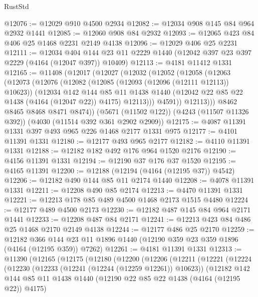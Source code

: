 \begin{lexlean}{RustStd}
\begin{coremodule}
@12076 := @12029 @910 @4500 @2934
@12082 := @12034 @908 @145 @84 @964 @2932 @1441
@12085 := @12060 @908 @84 @2932
@12093 := @12065 @423 @84 @406 @25 @1468 @2231 @2149 @4138
@12096 := @12029 @406 @25 @2231
@12111 := @12034
    @404
    @144
    @23
    @11
    @2229
    @1440
    (@12042 @397 @23 @397 @2229 (@4164 (@12047 @397)) @10409)
@12113 := @4181 @11412 @1331
@12165 := @11408
    (@12017
      (@12027
        (@12032
          (@12052
            (@12058
              (@12063
                (@12073
                  (@12076
                    (@12082
                      (@12085 (@12093 (@12096 (@12111 @12113)) @10623))
                      (@12034
                        @142
                        @144
                        @85
                        @11
                        @1438
                        @1440
                        (@12042 @22 @85 @22 @1438 (@4164 (@12047 @22)) @4175)
                        @12113)))
                  @4591))
              @12113)))
        @8462
        @8465
        @8468
        @8471
        @8474))
    (@5671 (@11502 @122))
    (@4243 (@11507 @11326 @392))
    (@4030 (@11514 @392 @361 @2902 @2909))
@12175 := @4087 @11391 @1331 @397 @493 @965 @226 @1468 @2177 @1331 @975
@12177 := @4101 @11391 @1331
@12180 := @12177 @493 @965 @2177
@12182 := @4110 @11391 @1331
@12188 := @12182 @182 @492 @176 @964 @1520 @2176
@12190 := @4156 @11391 @1331
@12194 := @12190 @37 @176 @37 @1520
@12195 := @4165 @11391
@12200 := @12188 (@12194 (@4164 (@12195 @37)) @4542)
@12206 := @12182 @490 @144 @85 @11 @2174 @1440
@12208 := @4078 @11391 @1331
@12211 := @12208 @490 @85 @2174
@12213 := @4470 @11391 @1331
@12221 := @12213 @178 @85 @489 @4500 @1468 @2173 @1515 @4480
@12224 := @12177 @489 @4500 @2173
@12230 := @12182 @487 @145 @84 @964 @2171 @1441
@12233 := @12208 @487 @84 @2171
@12241 := @12213 @423 @84 @486 @25 @1468 @2170 @2149 @4138
@12244 := @12177 @486 @25 @2170
@12259 := @12182
    @366
    @144
    @23
    @11
    @1896
    @1440
    (@12190 @359 @23 @359 @1896 (@4164 (@12195 @359)) @7262)
@12261 := @4181 @11391 @1331
@12313 := @11390
    (@12165
      (@12175
        (@12180
          (@12200
            (@12206
              (@12211
                (@12221
                  (@12224
                    (@12230
                      (@12233 (@12241 (@12244 (@12259 @12261)) @10623))
                      (@12182
                        @142
                        @144
                        @85
                        @11
                        @1438
                        @1440
                        (@12190 @22 @85 @22 @1438 (@4164 (@12195 @22)) @4175)

\end{coremodule}
\end{lexlean}
